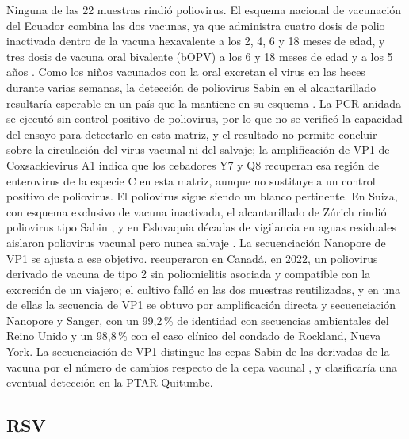 Ninguna de las 22 muestras rindió poliovirus. El esquema nacional de vacunación del Ecuador combina las dos vacunas, ya que administra cuatro dosis de polio inactivada dentro de la vacuna hexavalente a los 2, 4, 6 y 18 meses de edad, y tres dosis de vacuna oral bivalente (bOPV) a los 6 y 18 meses de edad y a los 5 años \cite{MSP_2023}. Como los niños vacunados con la oral excretan el virus en las heces durante varias semanas, la detección de poliovirus Sabin en el alcantarillado resultaría esperable en un país que la mantiene en su esquema \cite{MasLago_2003}. La PCR anidada se ejecutó sin control positivo de poliovirus, por lo que no se verificó la capacidad del ensayo para detectarlo en esta matriz, y el resultado no permite concluir sobre la circulación del virus vacunal ni del salvaje; la amplificación de VP1 de Coxsackievirus A1 indica que los cebadores Y7 y Q8 recuperan esa región de enterovirus de la especie C en esta matriz, aunque no sustituye a un control positivo de poliovirus. El poliovirus sigue siendo un blanco pertinente. En Suiza, con esquema exclusivo de vacuna inactivada, el alcantarillado de Zúrich rindió poliovirus tipo Sabin \cite{Zurbriggen_2008}, y en Eslovaquia décadas de vigilancia en aguas residuales aislaron poliovirus vacunal pero nunca salvaje \cite{Kissova_2022}. La secuenciación Nanopore de VP1 se ajusta a ese objetivo.  recuperaron en Canadá, en 2022, un poliovirus derivado de vacuna de tipo 2 sin poliomielitis asociada y compatible con la excreción de un viajero; el cultivo falló en las dos muestras reutilizadas, y en una de ellas la secuencia de VP1 se obtuvo por amplificación directa y secuenciación Nanopore y Sanger, con un 99,2\,\% de identidad con secuencias ambientales del Reino Unido y un 98,8\,\% con el caso clínico del condado de Rockland, Nueva York. La secuenciación de VP1 distingue las cepas Sabin de las derivadas de la vacuna por el número de cambios respecto de la cepa vacunal \cite{Klapsa_2022}, y clasificaría una eventual detección en la PTAR Quitumbe.

\subsection{RSV}

